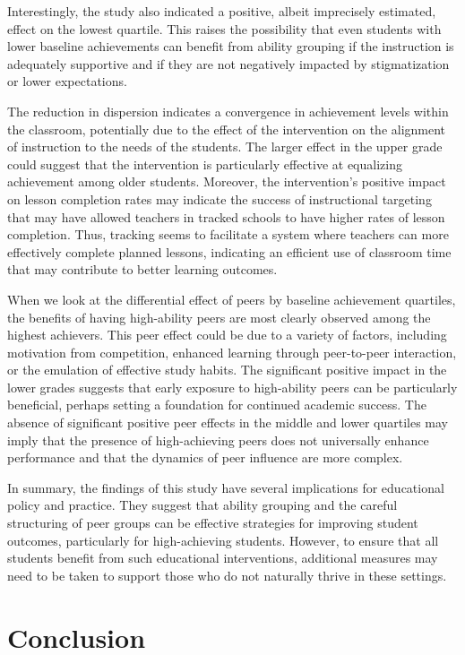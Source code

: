 \documentclass[12pt]{article}
\begin{document}
Interestingly, the study also indicated a positive, albeit imprecisely estimated, effect on the lowest quartile. This raises the possibility that even students with lower baseline achievements can benefit from ability grouping if the instruction is adequately supportive and if they are not negatively impacted by stigmatization or lower expectations.

The reduction in dispersion indicates a convergence in achievement levels within the classroom, potentially due to the effect of the intervention on the alignment of instruction to the needs of the students. The larger effect in the upper grade could suggest that the intervention is particularly effective at equalizing achievement among older students. Moreover, the intervention's positive impact on lesson completion rates may indicate the success of instructional targeting that may have allowed teachers in tracked schools to have higher rates of lesson completion. Thus, tracking seems to facilitate a system where teachers can more effectively complete planned lessons, indicating an efficient use of classroom time that may contribute to better learning outcomes.

When we look at the differential effect of peers by baseline achievement quartiles, the benefits of having high-ability peers are most clearly observed among the highest achievers. This peer effect could be due to a variety of factors, including motivation from competition, enhanced learning through peer-to-peer interaction, or the emulation of effective study habits. The significant positive impact in the lower grades suggests that early exposure to high-ability peers can be particularly beneficial, perhaps setting a foundation for continued academic success. The absence of significant positive peer effects in the middle and lower quartiles may imply that the presence of high-achieving peers does not universally enhance performance and that the dynamics of peer influence are more complex. 

In summary, the findings of this study have several implications for educational policy and practice. They suggest that ability grouping and the careful structuring of peer groups can be effective strategies for improving student outcomes, particularly for high-achieving students. However, to ensure that all students benefit from such educational interventions, additional measures may need to be taken to support those who do not naturally thrive in these settings.

\section{Conclusion}
\label{sec:conclude}
\end{document}
